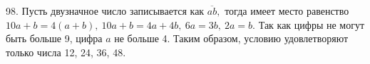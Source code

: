 98. Пусть двузначное число записывается как $\overline{ab},$ тогда имеет место равенство $10a+b=4(a+b),\ 10a+b=4a+4b,\ 6a=3b,\ 2a=b.$ Так как цифры не могут быть больше 9, цифра $a$ не больше 4. Таким образом, условию удовлетворяют только числа 12, 24, 36, 48.\\
